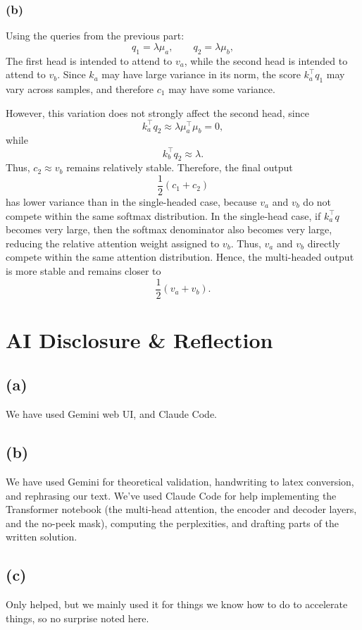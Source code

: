 \documentclass{article}
\begin{document}
\subsubsection*{(b)}
Using the queries from the previous part:
\[
q_1=\lambda\mu_a,\qquad q_2=\lambda\mu_b,
\]
The first head is intended to attend to $v_a$, while the second head is intended to attend to $v_b$. Since $k_a$ may have large variance in its norm, the score $k_a^\top q_1$ may vary across samples, and therefore $c_1$ may have some variance.

However, this variation does not strongly affect the second head, since
\[
k_a^\top q_2 \approx \lambda \mu_a^\top \mu_b = 0,
\]
while
\[
k_b^\top q_2 \approx \lambda.
\]
Thus, $c_2\approx v_b$ remains relatively stable. Therefore, the final output
\[
\frac{1}{2}(c_1+c_2)
\]
has lower variance than in the single-headed case, because $v_a$ and $v_b$ do not compete within the same softmax distribution. In the single-head case, if $k_a^\top q$ becomes very large, then the softmax denominator also becomes very large, reducing the relative attention weight assigned to $v_b$. Thus, $v_a$ and $v_b$ directly compete within the same attention distribution. Hence, the multi-headed output is more stable and remains closer to
\[
\frac{1}{2}(v_a+v_b).
\]
\section{AI Disclosure \& Reflection}

\subsection*{(a)}
We have used Gemini web UI, and Claude Code.

\subsection*{(b)}
We have used Gemini for theoretical validation, handwriting to latex conversion, and rephrasing our text. We've used Claude Code for help implementing the Transformer notebook (the multi-head attention, the encoder and decoder layers, and the no-peek mask), computing the perplexities, and drafting parts of the written solution.

\subsection*{(c)}
Only helped, but we mainly used it for things we know how to do to accelerate things, so no surprise noted here.
\end{document}
